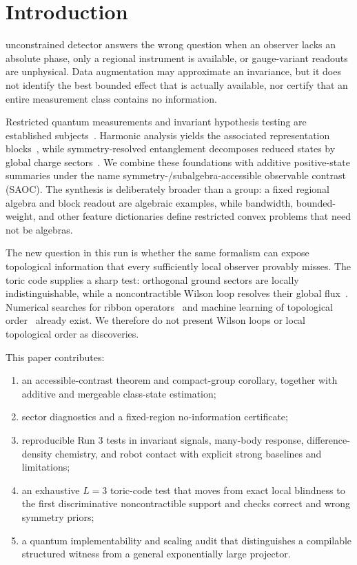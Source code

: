 \documentclass[letterpaper,journal]{IEEEtran}
\newcommand{\SAOC}{\textsc{SAOC}}
\begin{document}
\section{Introduction}

 unconstrained detector answers the wrong question when an
observer lacks an absolute phase, only a regional instrument is available, or
gauge-variant readouts are unphysical. Data augmentation may approximate an
invariance, but it does not identify the best bounded effect that is actually
available, nor certify that an entire measurement class contains no
information.

Restricted quantum measurements and invariant hypothesis testing are
established subjects~\cite{matthews2009,hiai2009}. Harmonic analysis yields
the associated representation blocks~\cite{serre1977,marvian2014}, while
symmetry-resolved entanglement decomposes reduced states by global charge
sectors~\cite{goldstein2018}. We combine these foundations with additive
positive-state summaries under the name symmetry-/subalgebra-accessible
observable contrast (\SAOC). The synthesis is deliberately broader than a
group: a fixed regional algebra and block readout are algebraic examples,
while bandwidth, bounded-weight, and other feature dictionaries define
restricted convex problems that need not be algebras.

The new question in this run is whether the same formalism can expose
topological information that every sufficiently local observer provably
misses. The toric code supplies a sharp test: orthogonal ground sectors are
locally indistinguishable, while a noncontractible Wilson loop resolves their
global flux~\cite{kitaev2003,bravyi2010}. Numerical searches for ribbon
operators~\cite{bridgeman2016} and machine learning of topological
order~\cite{che2026} already exist. We therefore do not present Wilson loops
or local topological order as discoveries.

This paper contributes:

\begin{enumerate}
\item an accessible-contrast theorem and compact-group corollary, together
with additive and mergeable class-state estimation;
\item sector diagnostics and a fixed-region no-information certificate;
\item reproducible Run 3 tests in invariant signals, many-body response,
difference-density chemistry, and robot contact with explicit strong
baselines and limitations;
\item an exhaustive $L=3$ toric-code test that moves from exact local
blindness to the first discriminative noncontractible support and checks
correct and wrong symmetry priors;
\item a quantum implementability and scaling audit that distinguishes a
compilable structured witness from a general exponentially large projector.
\end{enumerate}
\end{document}
